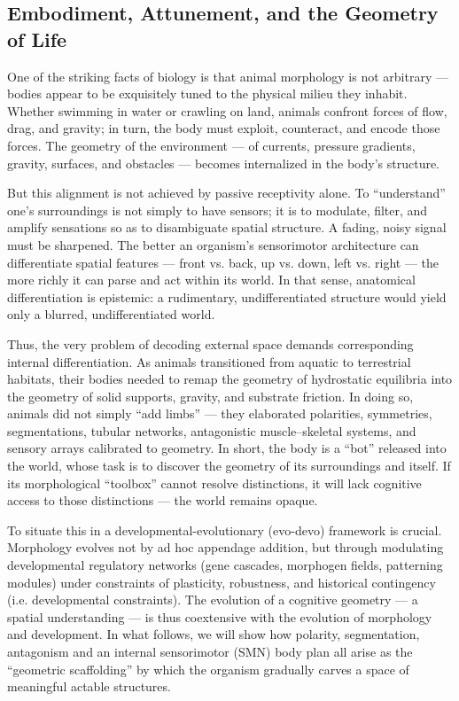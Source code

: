\subsection{Embodiment, Attunement, and the Geometry of Life}
One of the striking facts of biology is that animal morphology is not arbitrary — bodies appear to be exquisitely tuned to the physical milieu they inhabit. Whether swimming in water or crawling on land, animals confront forces of flow, drag, and gravity; in turn, the body must exploit, counteract, and encode those forces. The geometry of the environment — of currents, pressure gradients, gravity, surfaces, and obstacles — becomes internalized in the body’s structure.

But this alignment is not achieved by passive receptivity alone. To “understand” one’s surroundings is not simply to have sensors; it is to modulate, filter, and amplify sensations so as to disambiguate spatial structure. A fading, noisy signal must be sharpened. The better an organism’s sensorimotor architecture can differentiate spatial features — front vs. back, up vs. down, left vs. right — the more richly it can parse and act within its world. In that sense, anatomical differentiation is epistemic: a rudimentary, undifferentiated structure would yield only a blurred, undifferentiated world.

Thus, the very problem of decoding external space demands corresponding internal differentiation. As animals transitioned from aquatic to terrestrial habitats, their bodies needed to remap the geometry of hydrostatic equilibria into the geometry of solid supports, gravity, and substrate friction. In doing so, animals did not simply “add limbs” — they elaborated polarities, symmetries, segmentations, tubular networks, antagonistic muscle–skeletal systems, and sensory arrays calibrated to geometry. In short, the body is a “bot” released into the world, whose task is to discover the geometry of its surroundings and itself. If its morphological “toolbox” cannot resolve distinctions, it will lack cognitive access to those distinctions — the world remains opaque.

To situate this in a developmental-evolutionary (evo-devo) framework is crucial. Morphology evolves not by ad hoc appendage addition, but through modulating developmental regulatory networks (gene cascades, morphogen fields, patterning modules) under constraints of plasticity, robustness, and historical contingency (i.e. developmental constraints). The evolution of a cognitive geometry — a spatial understanding — is thus coextensive with the evolution of morphology and development. In what follows, we will show how polarity, segmentation, antagonism and an internal sensorimotor (SMN) body plan all arise as the “geometric scaffolding” by which the organism gradually carves a space of meaningful actable structures.

